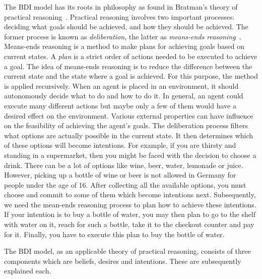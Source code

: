 The BDI model has its roots in philosophy as found in Bratman's theory of practical reasoning~\cite{Sebastian_Hierarchical_2006}.
Practical reasoning involves two important processes: deciding what goals should be achieved, and how they should be achieved.
The former process is known as \emph{deliberation}, the latter as \emph{means-ends reasoning}~\cite{Gerhard_MultiSystem_1999}.
Means-ends reasoning is a method to make plans for achieving goals based on current states.
A \emph{plan} is a strict order of actions needed to be executed to achieve a goal.
The idea of means-ends reasoning is to reduce the difference between the current state and the state where a goal is achieved.
For this purpose, the method is applied recursively.
When an agent is placed in an environment, it should autonomously decide what to do and how to do it.
In general, an agent could execute many different actions but maybe only a few of them would have a desired effect on the environment.
Various external properties can have influence on the feasibility of achieving the agent's goals.
The deliberation process filters what options are actually possible in the current state.
It then determines which of these options will become intentions.
For example, if you are thirsty and standing in a supermarket, then you might be faced with the decision to choose a drink.
There can be a lot of options like wine, beer, water, lemonade or juice.
However, picking up a bottle of wine or beer is not allowed in Germany for people under the age of 16. %
After collecting all the available options, you must choose and commit to some of them which become intentions next.
Subsequently, we need the mean-ends reasoning process to plan how to achieve these intentions.
If your intention is to buy a bottle of water, you may then plan to go to the shelf with water on it, reach for such a bottle, take it to the checkout counter and pay for it.
Finally, you have to execute this plan to buy the bottle of water.

The BDI model, as an applicable theory of practical reasoning, consists of three components which are beliefs, desires and intentions.
These are subsequently explained each.

